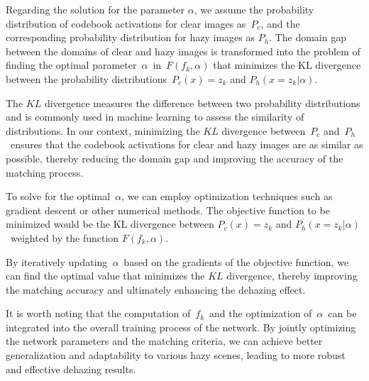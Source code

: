 \documentclass[journal]{IEEEtran}
\begin{document}
Regarding the solution for the parameter $\alpha$, we assume the probability distribution of codebook activations for clear images as $P_{c}$, and the corresponding probability distribution for hazy images as $P_{h}$. The domain gap between the domains of clear and hazy images is transformed into the problem of finding the optimal parameter $\alpha$ in $F(f_{k}, \alpha)$ that minimizes the KL divergence between the probability distributions $P_{c}(x) = z_{k}$ and $P_{h}(x = z_{k} | \alpha) $.


The $KL$ divergence measures the difference between two probability distributions and is commonly used in machine learning to assess the similarity of distributions. In our context, minimizing the $KL$ divergence between $P_{c}$ and $P_{h}$ ensures that the codebook activations for clear and hazy images are as similar as possible, thereby reducing the domain gap and improving the accuracy of the matching process.

To solve for the optimal $\alpha$, we can employ optimization techniques such as gradient descent or other numerical methods. The objective function to be minimized would be the KL divergence between $P_{c}(x) = z_{k}$ and $P_{h}(x = z_{k} | \alpha) $ weighted by  the function $F(f_{k}, \alpha)$.

By iteratively updating $\alpha$ based on the gradients of the objective function, we can find the optimal value that minimizes the $KL$ divergence, thereby improving the matching accuracy and ultimately enhancing the dehazing effect.

It is worth noting that the computation of $f_{k}$ and the optimization of $\alpha$ can be integrated into the overall training process of the network. By jointly optimizing the network parameters and the matching criteria, we can achieve better generalization and adaptability to various hazy scenes, leading to more robust and effective dehazing results.
\end{document}
